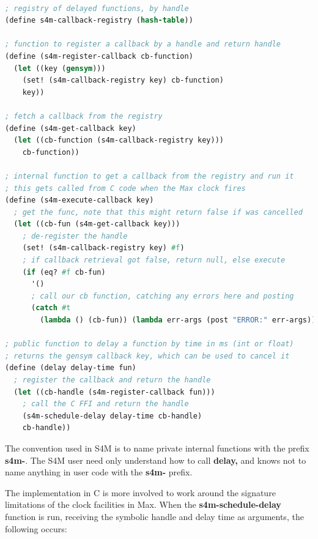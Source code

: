 \documentclass[acmsmall]{acmart}
\begin{document}
\begin{lstlisting}[language=lisp]

; registry of delayed functions, by handle 
(define s4m-callback-registry (hash-table))

; function to register a callback by a handle and return handle
(define (s4m-register-callback cb-function)
  (let ((key (gensym)))
    (set! (s4m-callback-registry key) cb-function)
    key))

; fetch a callback from the registry 
(define (s4m-get-callback key)
  (let ((cb-function (s4m-callback-registry key)))
    cb-function))

; internal function to get a callback from the registry and run it
; this gets called from C code when the Max clock fires
(define (s4m-execute-callback key)
  ; get the func, note that this might return false if was cancelled
  (let ((cb-fun (s4m-get-callback key)))
    ; de-register the handle
    (set! (s4m-callback-registry key) #f)
    ; if callback retrieval got false, return null, else execute 
    (if (eq? #f cb-fun) 
      '()
      ; call our cb function, catching any errors here and posting
      (catch #t 
        (lambda () (cb-fun)) (lambda err-args (post "ERROR:" err-args))))))

; public function to delay a function by time in ms (int or float)
; returns the gensym callback key, which can be used to cancel it
(define (delay delay-time fun)
  ; register the callback and return the handle
  (let ((cb-handle (s4m-register-callback fun)))
    ; call the C FFI and return the handle
    (s4m-schedule-delay delay-time cb-handle)
    cb-handle))

\end{lstlisting}

The convention used in S4M is to name private internal functions with the
prefix \textbf{s4m-}. The S4M user need only understand how to call
\textbf{delay,} and knows not to name anything in user code with the \textbf{s4m-} prefix.

The implementation in C is more involved to work around the signature 
limitations of the clock facilities in Max.
When the \textbf{s4m-schedule-delay} function is run, receiving the symbolic handle
and delay time as arguments, the following occurs:
\end{document}

